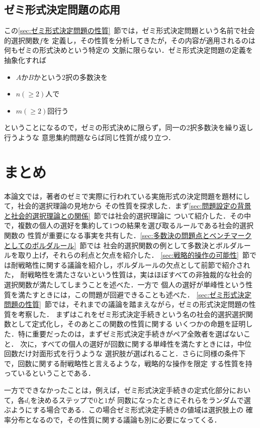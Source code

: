 \documentclass[dvipdfmx]{jsarticle}
\begin{document}
\subsection{ゼミ形式決定問題の応用}\label{subsec:ゼミ形式決定問題の応用}
  この\ref{sec:ゼミ形式決定問題の性質}~節では，ゼミ形式決定問題という名前で社会的選択関数$f$を
  定義し，その性質を分析してきたが，その内容が適用されるのは何もゼミの形式決めという特定の
  文脈に限らない．ゼミ形式決定問題の定義を抽象化すれば
  \begin{itemize}
    \item $A$か$B$かという$2$択の多数決を
    \item $n(\geq 2)$人で
    \item $m(\geq 2)$回行う
  \end{itemize}
  ということになるので，ゼミの形式決めに限らず，同一の2択多数決を繰り返し行うような
  意思集約問題ならば同じ性質が成り立つ．

\newpage
\section{まとめ}
本論文では，著者のゼミで実際に行われている実施形式の決定問題を題材にして，社会的選択理論の見地から
その性質を探求した．まず\ref{sec:問題設定の背景と社会的選択理論との関係}~節では社会的選択理論に
ついて紹介した．その中で，複数の個人の選好を集約して$1$つの結果を選び取るルールである社会的選択関数の
性質が重要になる事実を共有した．\ref{sec:多数決の問題点とベンチマークとしてのボルダルール}~節では
社会的選択関数の例として多数決とボルダルールを取り上げ，それらの利点と欠点を紹介した．
\ref{sec:戦略的操作の可能性}~節では耐戦略性に関する議論を紹介し，ボルダルールの欠点として前節で紹介された，
耐戦略性を満たさないという性質は，実はほぼすべての非独裁的な社会的選択関数が満たしてしまうことを述べた．一方で
個人の選好が単峰性という性質を満たすときには，この問題が回避できることも述べた．
\ref{sec:ゼミ形式決定問題の性質}~節では，それまでの議論を踏まえながら，ゼミの形式決定問題の性質を考察した．
まずはこれをゼミ形式決定手続きという名の社会的選択選択関数として定式化し，そのあとこの関数の性質に関する
いくつかの命題を証明した．特に重要だったのは，まずゼミ形式決定手続きがペア全敗者を選ばないこと．
次に，すべての個人の選好が回数に関する単峰性を満たすときには，中位回数だけ対面形式を行うような
選択肢が選ばれること．さらに同様の条件下で，回数に関する耐戦略性と言えるような，戦略的な操作を限定
する性質を持っているということである．

一方でできなかったことは，例えば，ゼミ形式決定手続きの定式化部分において，各$d_i$を決めるステップで$0$と$1$が
同数になったときにそれらをランダムで選ぶようにする場合である．この場合ゼミ形式決定手続きの値域は選択肢上の
確率分布となるので，その性質に関する議論も別に必要になってくる．
\end{document}
